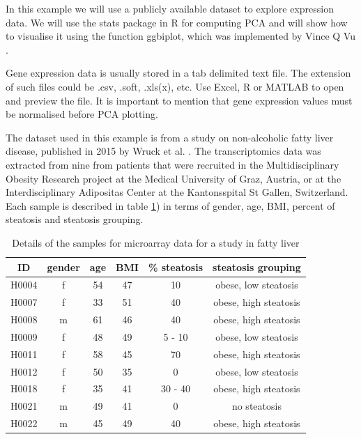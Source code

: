 \documentclass[11pt, oneside]{article}   	%
\begin{document}
In this example we will use a publicly available dataset to explore expression data. We will use the stats package in R for computing PCA and will show how to visualise it using the function ggbiplot, which was implemented by Vince Q Vu \cite{Vu2016}. 


Gene expression data is usually stored in a tab delimited text file. The extension of such files could be .csv, .soft, .xls(x), etc. Use Excel, R or MATLAB to open and preview the file. It is important to mention that gene expression values must be normalised before PCA plotting.

The dataset used in this example is from a study on non-alcoholic fatty liver disease, published in 2015 by Wruck et al. \cite{Wruck2015}. The transcriptomics data was extracted from nine from patients that were recruited in the Multidisciplinary Obesity Research project at the Medical University of Graz, Austria, or at the Interdisciplinary Adipositas Center at the Kantonsspital St Gallen, Switzerland. Each sample is described in table \ref{tab:ExpressionDataWruck}) in terms of gender, age, BMI, percent of steatosis and steatosis grouping.

\begin{table}[h]
	\centering
	\caption{Details of the samples for microarray data for a study in fatty liver \cite{Wruck2015}}
	\begin{tabular}{c | c | c | c | c | c}
		\hline
		ID & gender & age & BMI & \% steatosis & steatosis grouping \\
		\hline
                H0004 & f & 54 & 47 & 10 & obese, low steatosis \\
                H0007 & f & 33 & 51 & 40 & obese, high steatosis \\
                H0008 & m & 61 & 46 & 40 & obese, high steatosis \\
                H0009 & f & 48 & 49 & 5 - 10 & obese, low steatosis \\
                H0011 & f & 58 & 45 & 70 & obese, high steatosis \\
                H0012 & f & 50 & 35 & 0 & obese, low steatosis \\
                H0018 & f & 35 & 41 & 30 - 40 & obese, high steatosis \\
                H0021 & m & 49 & 41 & 0 & no steatosis \\
                H0022 & m & 45 & 49 & 40 & obese, high steatosis
		\label{tab:ExpressionDataWruck}
	\end{tabular}
\end{table}
\end{document}
